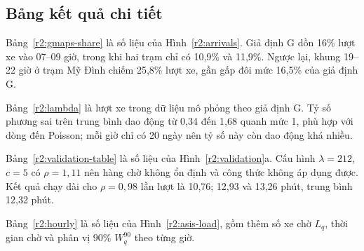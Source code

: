 \subsection{Bảng kết quả chi tiết}
\label{r2:app-tables}
\noindent
Bảng~\ref{r2:gmaps-share} là số liệu của Hình~\ref{r2:arrivals}. Giả định G
dồn 16\% lượt xe vào 07--09 giờ, trong khi hai trạm chỉ có 10,9\% và 11,9\%.
Ngược lại, khung 19--22 giờ ở trạm Mỹ Đình chiếm 25,8\% lượt xe, gần gấp đôi
mức 16,5\% của giả định G.
\begin{table}[H]\centering\small
\caption{Tỷ trọng và lượt xe theo giờ: giả định G so với Google Maps, trung bình 7 ngày}\label{r2:gmaps-share}
\resizebox{\ifdim\width>\linewidth\linewidth\else\width\fi}{!}{}
\end{table}

Bảng~\ref{r2:lambda} là lượt xe trong dữ liệu mô phỏng theo giả định G. Tỷ số phương sai
trên trung bình dao động từ 0,34 đến 1,68 quanh mức 1, phù hợp với dòng đến
Poisson; mỗi giờ chỉ có 20 ngày nên tỷ số này còn dao động khá nhiều.
\begin{table}[H]\centering\small
\caption{Lượt xe đến theo giờ trong dữ liệu mô phỏng}\label{r2:lambda}
\resizebox{\ifdim\width>\linewidth\linewidth\else\width\fi}{!}{}
\end{table}

Bảng~\ref{r2:validation-table} là số liệu của Hình~\ref{r2:validation}a. Cấu
hình $\lambda=212$, $c=5$ có $\rho=1{,}11$ nên hàng chờ không ổn định và công
thức không áp dụng được. Kết quả chạy dài cho $\rho=0{,}98$ lần lượt là 10,76;
12,93 và 13,26 phút, trung bình 12,32 phút.
\begin{table}[H]\centering\small
\caption{Đối chiếu M/M/c với mô phỏng, mỗi cấu hình 40 ngày (một loại xe, CV = 1, không bỏ đi)}\label{r2:validation-table}
\resizebox{\ifdim\width>\linewidth\linewidth\else\width\fi}{!}{}
\end{table}

Bảng~\ref{r2:hourly} là số liệu của Hình~\ref{r2:asis-load}, gồm thêm số xe
chờ $L_q$, thời gian chờ và phân vị 90\% $W_q^{90}$ theo từng giờ.
\begin{table}[H]\centering\small
\caption{M/M/c theo giờ với 6 kênh và $E[S]=1{,}57$ phút}\label{r2:hourly}
\resizebox{\ifdim\width>\linewidth\linewidth\else\width\fi}{!}{}
\end{table}
\FloatBarrier

